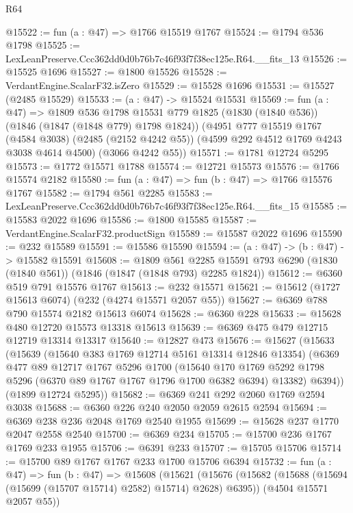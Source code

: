 \begin{lexlean}{R64}
\begin{coremodule}
@15522 := fun (a : @47) => @1766 @15519 @1767
@15524 := @1794 @536 @1798
@15525 := LexLeanPreserve.Ccc362dd0d0b76b7c46f93f7f38ec125e.R64.__fits_13
@15526 := @15525 @1696
@15527 := @1800 @15526
@15528 := VerdantEngine.ScalarF32.isZero
@15529 := @15528 @1696
@15531 := @15527 (@2485 @15529)
@15533 := (a : @47) -> @15524 @15531
@15569 := fun (a : @47) =>
  @1809
    @536
    @1798
    @15531
    @779
    @1825
    (@1830 (@1840 @536))
    (@1846 (@1847 (@1848 @779) @1798 @1824))
    (@4951
      @777
      @15519
      @1767
      (@4584 @3038)
      (@2485 (@2152 @4242 @55))
      (@4599 @292 @4512 @1769 @4243 @3038 @4614 @4500)
      (@3066 @4242 @55))
@15571 := @1781 @12724 @5295
@15573 := @1772 @15571 @1788
@15574 := @12721 @15573
@15576 := @1766 @15574 @2182
@15580 := fun (a : @47) => fun (b : @47) => @1766 @15576 @1767
@15582 := @1794 @561 @2285
@15583 := LexLeanPreserve.Ccc362dd0d0b76b7c46f93f7f38ec125e.R64.__fits_15
@15585 := @15583 @2022 @1696
@15586 := @1800 @15585
@15587 := VerdantEngine.ScalarF32.productSign
@15589 := @15587 @2022 @1696
@15590 := @232 @15589
@15591 := @15586 @15590
@15594 := (a : @47) -> (b : @47) -> @15582 @15591
@15608 := @1809
    @561
    @2285
    @15591
    @793
    @6290
    (@1830 (@1840 @561))
    (@1846 (@1847 (@1848 @793) @2285 @1824))
@15612 := @6360 @519 @791 @15576 @1767
@15613 := @232 @15571
@15621 := @15612 (@1727 @15613 @6074) (@232 (@4274 @15571 @2057 @55))
@15627 := @6369 @788 @790 @15574 @2182 @15613 @6074
@15628 := @6360 @228
@15633 := @15628 @480 @12720 @15573 @13318 @15613
@15639 := @6369 @475 @479 @12715 @12719 @13314 @13317
@15640 := @12827 @473
@15676 := @15627
    (@15633
      (@15639
        (@15640 @383 @1769 @12714 @5161 @13314 @12846 @13354)
        (@6369
          @477
          @89
          @12717
          @1767
          @5296
          @1700
          (@15640
            @170
            @1769
            @5292
            @1798
            @5296
            (@6370 @89 @1767 @1767 @1796 @1700 @6382 @6394)
            @13382)
          @6394))
      (@1899 @12724 @5295))
@15682 := @6369 @241 @292 @2060 @1769 @2594 @3038
@15688 := @6360 @226 @240 @2050 @2059 @2615 @2594
@15694 := @6369 @238 @236 @2048 @1769 @2540 @1955
@15699 := @15628 @237 @1770 @2047 @2558 @2540
@15700 := @6369 @234
@15705 := @15700 @236 @1767 @1769 @233 @1955
@15706 := @6391 @233
@15707 := @15705 @15706
@15714 := @15700 @89 @1767 @1767 @233 @1700 @15706 @6394
@15732 := fun (a : @47) =>
  fun (b : @47) =>
  @15608
    (@15621
      (@15676 (@15682 (@15688 (@15694 (@15699 (@15707 @15714) @2582) @15714) @2628) @6395))
      (@4504 @15571 @2057 @55))

\end{coremodule}
\end{lexlean}
